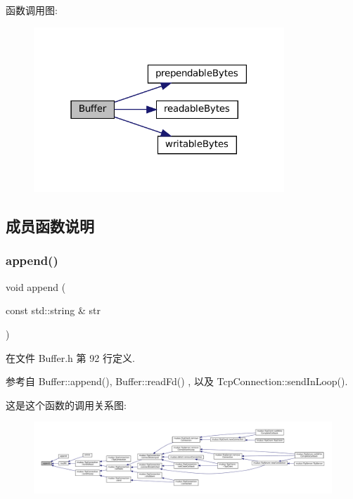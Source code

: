函数调用图\+:
\nopagebreak
\begin{figure}[H]
\begin{center}
\leavevmode
\includegraphics[width=267pt]{classmuduo_1_1Buffer_a47587d18a394fb4b9508c61e3d5f0260_cgraph}
\end{center}
\end{figure}


\subsection{成员函数说明}
\mbox{\label{classmuduo_1_1Buffer_ab66de892814847f1cd274aa887c4ff66}} 
\subsubsection{\texorpdfstring{append()}{append()}\hspace{0.1cm}{\footnotesize\ttfamily [1/3]}}
{\footnotesize\ttfamily void append (\begin{DoxyParamCaption}\item[{const std\+::string \&}]{str }\end{DoxyParamCaption})\hspace{0.3cm}{\ttfamily [inline]}}



在文件 Buffer.\+h 第 92 行定义.



参考自 Buffer\+::append(), Buffer\+::read\+Fd() , 以及 Tcp\+Connection\+::send\+In\+Loop().

这是这个函数的调用关系图\+:
\nopagebreak
\begin{figure}[H]
\begin{center}
\leavevmode
\includegraphics[width=350pt]{classmuduo_1_1Buffer_ab66de892814847f1cd274aa887c4ff66_icgraph}
\end{center}
\end{figure}
\mbox{\label{classmuduo_1_1Buffer_adece1d853752b95184d19c78228a0c39}} 
